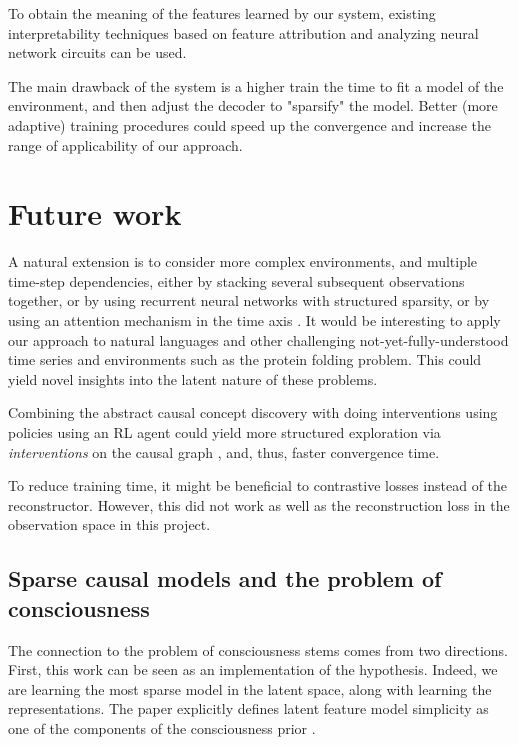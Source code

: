 \documentclass[a4paper,11pt,oneside]{report}
\begin{document}
To obtain the meaning of the features learned by our system, existing interpretability techniques based on feature attribution and analyzing neural network circuits \cite{goh2021multimodal} can be used.

The main drawback of the system is a higher train the time to fit a model of the environment, and then adjust the decoder to "sparsify" the model. Better (more adaptive) training procedures could speed up the convergence and increase the range of applicability of our approach.

\section{Future work}
A natural extension is to consider more complex environments, and multiple time-step dependencies, either by stacking several subsequent observations together, or by using recurrent neural networks with structured sparsity, or by using an attention mechanism in the time axis \cite{Nauta2019}. It would be interesting to apply our approach to natural languages and other challenging not-yet-fully-understood time series and environments such as the protein folding problem. This could yield novel insights into the latent nature of these problems.

Combining the abstract causal concept discovery with doing interventions using policies \cite{Volodin2020} using an RL agent could yield more structured exploration via {\em interventions} on the causal graph \cite{He2008,Frisch2014,Pathak2017,Dasgupta2019}, and, thus, faster convergence time.

To reduce training time, it might be beneficial to contrastive losses \cite{VanDenOord2018,Kipf2020,Mohammadi2020} instead of the reconstructor. However, this did not work as well as the reconstruction loss in the observation space in this project.

\subsection{Sparse causal models and the problem of consciousness}
The connection to the problem of consciousness stems comes from two directions. First, this work can be seen as an implementation of the \cite{Bengio2017} hypothesis. Indeed, we are learning the most sparse model in the latent space, along with learning the representations. The paper explicitly defines latent feature model simplicity as one of the components of the consciousness prior \cite{Bengio2017}.
\end{document}
